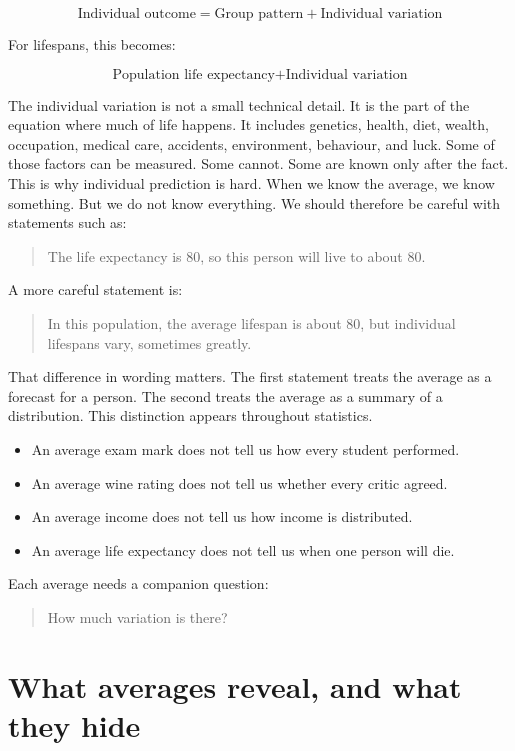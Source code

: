\documentclass[
  letterpaper,
  DIV=11,
  numbers=noendperiod]{scrreprt}
\providecommand{\tightlist}{%
  \setlength{\itemsep}{0pt}\setlength{\parskip}{0pt}}
\begin{document}
\[
\text{Individual outcome} = \text{Group pattern} + \text{Individual variation}
\]

For lifespans, this becomes:

\[
\text{Population life expectancy}
+
\text{Individual variation}
\]

The individual variation is not a small technical detail. It is the part
of the equation where much of life happens. It includes genetics,
health, diet, wealth, occupation, medical care, accidents, environment,
behaviour, and luck. Some of those factors can be measured. Some cannot.
Some are known only after the fact. This is why individual prediction is
hard. When we know the average, we know something. But we do not know
everything. We should therefore be careful with statements such as:

\begin{quote}
The life expectancy is 80, so this person will live to about 80.
\end{quote}

A more careful statement is:

\begin{quote}
In this population, the average lifespan is about 80, but individual
lifespans vary, sometimes greatly.
\end{quote}

That difference in wording matters. The first statement treats the
average as a forecast for a person. The second treats the average as a
summary of a distribution. This distinction appears throughout
statistics.

\begin{itemize}
\tightlist
\item
  An average exam mark does not tell us how every student performed.
\item
  An average wine rating does not tell us whether every critic agreed.
\item
  An average income does not tell us how income is distributed.
\item
  An average life expectancy does not tell us when one person will die.
\end{itemize}

Each average needs a companion question:

\begin{quote}
How much variation is there?
\end{quote}

\section{What averages reveal, and what they
hide}\label{what-averages-reveal-and-what-they-hide}
\end{document}
